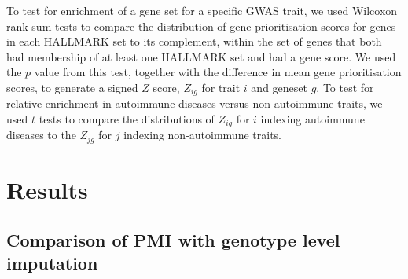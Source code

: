 \documentclass[a4paper,11pt]{book}
\begin{document}
To test for enrichment of a gene set for a specific GWAS trait, we used Wilcoxon rank sum tests to compare the distribution of gene prioritisation scores for genes in each HALLMARK set to its complement, within the set of genes that both had membership of at least one HALLMARK set and had a gene score.  We used the $p$ value from this test, together with the difference in mean gene prioritisation scores, to generate a signed $Z$ score, $Z_{ig}$ for trait $i$ and geneset $g$.  To test for relative enrichment in autoimmune diseases versus non-autoimmune traits, we used $t$ tests to compare the distributions of $Z_{ig}$ for $i$ indexing autoimmune diseases to the $Z_{jg}$ for $j$ indexing non-autoimmune traits.


\chapter{Results}

\section{Comparison of PMI with genotype level imputation}


\end{document}
